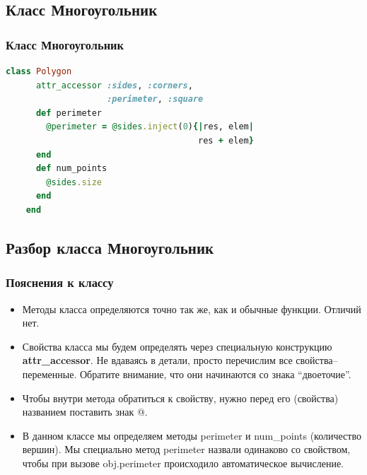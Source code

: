 \documentclass[compress,red]{beamer}
\begin{document}
\subsection{Класс Многоугольник}
\begin{frame}[fragile]
  \frametitle{Класс Многоугольник}
  \scriptsize{
  \begin{lstlisting}[language=ruby,basicstyle=\footnotesize,label=ruby1,caption=Класс Многоугольник]
    class Polygon
      attr_accessor :sides, :corners,
                    :perimeter, :square
      def perimeter
        @perimeter = @sides.inject(0){|res, elem| 
                                      res + elem}
      end
      def num_points
        @sides.size
      end
    end
  \end{lstlisting}
  }
\end{frame}

\subsection{Разбор класса Многоугольник}
\begin{frame}[fragile]
  \frametitle{Пояснения к классу}
  \begin{itemize}
    \item Методы класса определяются точно так же, как и обычные функции. Отличий нет.
    \item Свойства класса мы будем определять через специальную конструкцию \textbf{attr\_accessor}. Не вдаваясь в детали, просто перечислим все свойства--переменные. Обратите внимание, что они начинаются со знака ``двоеточие''.
    \item Чтобы внутри метода обратиться к свойству, нужно перед его (свойства) названием поставить знак @.
    \item В данном классе мы определяем методы perimeter и num\_points (количество вершин). Мы специально метод perimeter назвали одинаково со свойством, чтобы при вызове obj.perimeter происходило автоматическое вычисление.
  \end{itemize}
\end{frame}
\end{document}
